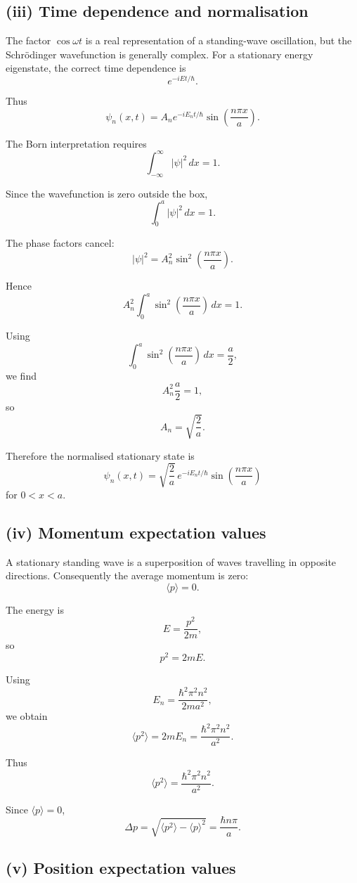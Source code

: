 \documentclass[11pt,a4paper]{article}
\begin{document}
\subsection{(iii) Time dependence and normalisation}

The factor $\cos\omega t$ is a real representation of a standing-wave oscillation,
but the Schrödinger wavefunction is generally complex. For a stationary energy
eigenstate, the correct time dependence is
\[
e^{-iEt/\hbar}.
\]

Thus
\[
\psi_n(x,t)
=
A_ne^{-iE_nt/\hbar}
\sin\left(\frac{n\pi x}{a}\right).
\]

The Born interpretation requires
\[
\int_{-\infty}^{\infty}|\psi|^2\,dx=1.
\]

Since the wavefunction is zero outside the box,
\[
\int_0^a|\psi|^2\,dx=1.
\]

The phase factors cancel:
\[
|\psi|^2
=
A_n^2
\sin^2\left(\frac{n\pi x}{a}\right).
\]

Hence
\[
A_n^2
\int_0^a
\sin^2\left(\frac{n\pi x}{a}\right)\,dx
=1.
\]

Using
\[
\int_0^a
\sin^2\left(\frac{n\pi x}{a}\right)\,dx
=
\frac a2,
\]
we find
\[
A_n^2\frac a2=1,
\]
so
\[
\boxed{A_n=\sqrt{\frac2a}}.
\]

Therefore the normalised stationary state is
\[
\boxed{
\psi_n(x,t)
=
\sqrt{\frac2a}\,
e^{-iE_nt/\hbar}
\sin\left(\frac{n\pi x}{a}\right)
}
\]
for $0<x<a$.

\subsection{(iv) Momentum expectation values}

A stationary standing wave is a superposition of waves travelling in opposite
directions. Consequently the average momentum is zero:
\[
\boxed{\langle p\rangle=0}.
\]

The energy is
\[
E=\frac{p^2}{2m},
\]
so
\[
p^2=2mE.
\]

Using
\[
E_n=\frac{\hbar^2\pi^2n^2}{2ma^2},
\]
we obtain
\[
\langle p^2\rangle
=
2mE_n
=
\frac{\hbar^2\pi^2n^2}{a^2}.
\]

Thus
\[
\boxed{
\langle p^2\rangle
=
\frac{\hbar^2\pi^2n^2}{a^2}
}.
\]

Since $\langle p\rangle=0$,
\[
\Delta p
=
\sqrt{\langle p^2\rangle-\langle p\rangle^2}
=
\frac{\hbar n\pi}{a}.
\]

\subsection{(v) Position expectation values}
\end{document}
